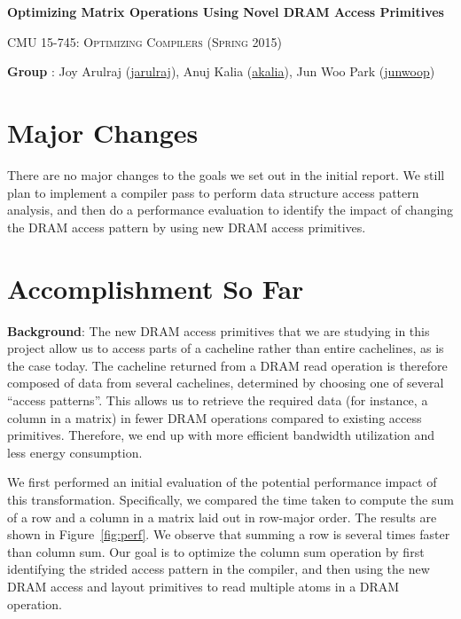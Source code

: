 \documentclass[letterpaper]{article}
\makeatletter
\newcommand{\email}[1]{\href{mailto:#1@cs.cmu.edu}{#1}}
\makeatother
\begin{document}
\section*{}
\begin{center}
  \centerline{\textbf{\Large Optimizing Matrix Operations Using Novel DRAM
  Access Primitives}}
  \vspace{1em}
  \textsc{\large CMU 15-745: Optimizing Compilers (Spring 2015)} \\
  \vspace{3em}
  \centerline{\large{\textbf{Group} : Joy Arulraj (\email{jarulraj}), Anuj Kalia
  (\email{akalia})}, Jun Woo Park (\email{junwoop}) }
  \vspace{1em}
\end{center}

\section{Major Changes}

There are no major changes to the goals we set out in the initial report.
We still plan to implement a compiler pass to perform data structure access pattern analysis, and
then do a performance evaluation to identify the impact of changing the DRAM
access pattern by using new DRAM access primitives.

\section{Accomplishment So Far}

\textbf{Background}: The new DRAM access primitives that we are studying in
this project allow us to access parts of a cacheline rather than entire cachelines,
as is the case today. The cacheline returned from a DRAM read operation is
therefore composed of data from several cachelines, determined by choosing one
of several ``access patterns''.
This allows us to retrieve the required data (for instance, a column in a matrix) in fewer DRAM operations
compared to existing access primitives. Therefore, we end up with more efficient bandwidth
utilization and less energy consumption.

We first performed an initial evaluation of the potential performance impact of this transformation.
Specifically, we compared the time taken to compute the sum of a row and a column in a matrix laid out in
row-major order. The results are shown in Figure~\ref{fig:perf}. We observe that summing a row is several times faster than column sum.
Our goal is to optimize the column sum operation by first identifying the
strided access pattern in the compiler, and then using the new DRAM access and
layout primitives to read multiple atoms in a DRAM operation.
\end{document}
